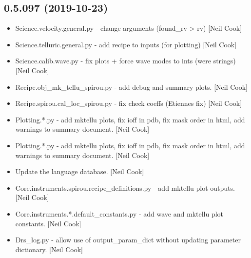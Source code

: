 \documentclass[a4paper,10pt,english]{report}
\begin{document}
\subsection{0.5.097 (2019-10-23)}
\label{\detokenize{misc/changelog:id44}}\begin{itemize}
\item {} 
Science.velocity.general.py - change arguments (found\_rv \textendash{}\textgreater{} rv) {[}Neil
Cook{]}

\item {} 
Science.telluric.general.py - add recipe to inputs (for plotting)
{[}Neil Cook{]}

\item {} 
Science.calib.wave.py - fix plots + force wave modes to ints (were
strings) {[}Neil Cook{]}

\item {} 
Recipe.obj\_mk\_tellu\_spirou.py - add debug and summary plots. {[}Neil
Cook{]}

\item {} 
Recipe.spirou.cal\_loc\_spirou.py - fix check coeffs (Etiennes fix)
{[}Neil Cook{]}

\item {} 
Plotting.*.py - add mktellu plots, fix ioff in pdb, fix mask order in
html, add warnings to summary document. {[}Neil Cook{]}

\item {} 
Plotting.*.py - add mktellu plots, fix ioff in pdb, fix mask order in
html, add warnings to summary document. {[}Neil Cook{]}

\item {} 
Update the language database. {[}Neil Cook{]}

\item {} 
Core.instruments.spirou.recipe\_definitions.py - add mktellu plot
outputs. {[}Neil Cook{]}

\item {} 
Core.instruments.*.default\_constants.py - add wave and mktellu plot
constants. {[}Neil Cook{]}

\item {} 
Drs\_log.py - allow use of output\_param\_dict without updating parameter
dictionary. {[}Neil Cook{]}

\end{itemize}
\end{document}
